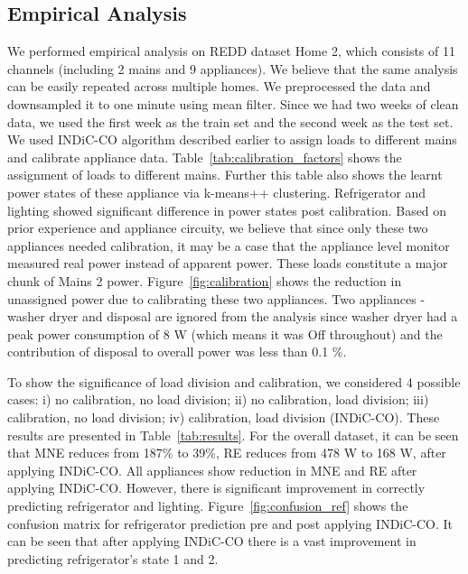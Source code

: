 \documentclass[conference]{IEEEtran}
\newcommand{\figref}[1]{Figure~\ref{#1}}
\newcommand{\tabref}[1]{Table~\ref{#1}}
\begin{document}
\subsection{Empirical Analysis}
\noindent We performed empirical analysis on REDD dataset Home 2, which consists of 11 channels (including 2 mains and 9 appliances). We believe that the same analysis can be easily repeated across multiple homes. We preprocessed the data and downsampled it to one minute using mean filter. Since we had two weeks of clean data, we used the first week as the train set and the second week as the test set. We used INDiC-CO algorithm described earlier to assign loads to different mains and calibrate appliance data. \tabref{tab:calibration_factors} shows the assignment of loads to different mains. Further this table also shows the learnt power states of these appliance via k-means++ clustering. Refrigerator and lighting showed significant difference in power states post calibration. Based on prior experience and appliance circuity, we believe that since only these two appliances needed calibration, it may be a case that the appliance level monitor measured real power instead of apparent power. These loads constitute a major chunk of Mains 2 power. \figref{fig:calibration} shows the reduction in unassigned power due to calibrating these two appliances. Two appliances - washer dryer and disposal are ignored from the analysis since washer dryer had a peak power consumption of 8 W (which means it was Off throughout) and the contribution of disposal to overall power was less than 0.1 \%. 

\noindent To show the significance of load division and calibration, we considered 4 possible cases:  i) no calibration, no load division; ii) no calibration, load division; iii) calibration, no load division; iv) calibration, load division (INDiC-CO). These results are presented in \tabref{tab:results}. For the overall dataset, it can be seen that MNE reduces from 187\% to 39\%, RE reduces from 478 W to 168 W, after applying INDiC-CO. All appliances show reduction in MNE and RE after applying INDiC-CO. However, there is significant improvement in correctly predicting refrigerator and lighting. \figref{fig:confusion_ref} shows the confusion matrix for refrigerator prediction pre and post applying INDiC-CO. It can be seen that after applying INDiC-CO there is a vast improvement in predicting refrigerator's state 1 and 2.
%
\end{document}
